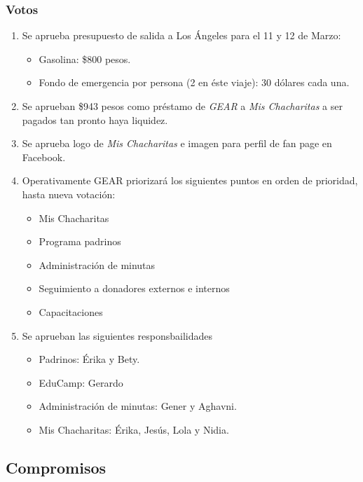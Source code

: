 \documentclass[]{book}
\providecommand{\tightlist}{%
  \setlength{\itemsep}{0pt}\setlength{\parskip}{0pt}}
\begin{document}
\subsubsection{Votos}\label{votos-2}

\begin{enumerate}
\def\labelenumi{\arabic{enumi}.}
\tightlist
\item
  Se aprueba presupuesto de salida a Los Ángeles para el 11 y 12 de
  Marzo:

  \begin{itemize}
  \tightlist
  \item
    Gasolina: \$800 pesos.
  \item
    Fondo de emergencia por persona (2 en éste viaje): 30 dólares cada
    una.
  \end{itemize}
\item
  Se aprueban \$943 pesos como préstamo de \emph{GEAR} a \emph{Mis
  Chacharitas} a ser pagados tan pronto haya liquidez.
\item
  Se aprueba logo de \emph{Mis Chacharitas} e imagen para perfil de fan
  page en Facebook.
\item
  Operativamente GEAR priorizará los siguientes puntos en orden de
  prioridad, hasta nueva votación:

  \begin{itemize}
  \tightlist
  \item
    Mis Chacharitas
  \item
    Programa padrinos
  \item
    Administración de minutas
  \item
    Seguimiento a donadores externos e internos
  \item
    Capacitaciones
  \end{itemize}
\item
  Se aprueban las siguientes responsbailidades

  \begin{itemize}
  \tightlist
  \item
    Padrinos: Érika y Bety.
  \item
    EduCamp: Gerardo
  \item
    Administración de minutas: Gener y Aghavni.
  \item
    Mis Chacharitas: Érika, Jesús, Lola y Nidia.
  \end{itemize}
\end{enumerate}

\subsection{Compromisos}\label{compromisos-2}
\end{document}
